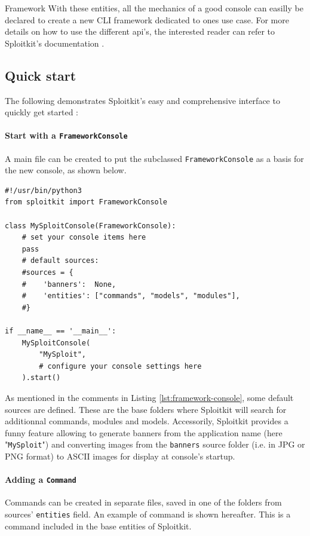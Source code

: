 \begin{chaptercover}{Framework}
With these entities, all the mechanics of a good console can easilly be declared to create a new CLI framework dedicated to ones use case. For more details on how to use the different \acrshort{api}'s, the interested reader can refer to Sploitkit's documentation \cite{sploitkit-docs}.

\subsection{Quick start}\label{subsec:sploitkit-quickstart}

The following demonstrates Sploitkit's easy and comprehensive interface to quickly get started :

\paragraph{Start with a \texttt{FrameworkConsole}} A main file can be created to put the subclassed \texttt{FrameworkConsole} as a basis for the new console, as shown below.

\begin{center}
\begin{lstlisting}[caption={Main file \texttt{main.py} for the new console},emph={MySploitConsole,FrameworkConsole}]
#!/usr/bin/python3
from sploitkit import FrameworkConsole

class MySploitConsole(FrameworkConsole):
    # set your console items here
    pass
    # default sources:
    #sources = {
    #    'banners':  None,
    #    'entities': ["commands", "models", "modules"],
    #} 

if __name__ == '__main__':
    MySploitConsole(
        "MySploit",
        # configure your console settings here
    ).start()
\end{lstlisting}\label{lst:framework-console}
\end{center}

As mentioned in the comments in Listing \ref{lst:framework-console}, some default sources are defined. These are the base folders where Sploitkit will search for additionnal commands, modules and models. Accessorily, Sploitkit provides a funny feature allowing to generate banners from the application name (here "\texttt{MySploit}") and converting images from the \texttt{banners} source folder (i.e. in JPG or PNG format) to ASCII images for display at console's startup.

\paragraph{Adding a \texttt{Command}} Commands can be created in separate files, saved in one of the folders from sources' \texttt{entities} field. An example of command is shown hereafter. This is a command included in the base entities of Sploitkit.


\end{chaptercover}
